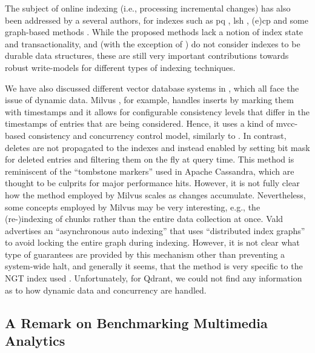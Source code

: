 The subject of online indexing (i.e., processing incremental changes) has also been addressed by a several authors, for indexes such as \acrshort{pq} \cite{Xu:2018Online}, \acrshort{lsh} \cite{Cakir:2015Adaptive}, (e)\acrshort{cp} \cite{Hojsgaard:2019Index} and some graph-based methods \cite{Zhao:2022Approximate}. While the proposed methods lack a notion of index state and transactionality, and (with the exception of \cite{Hojsgaard:2019Index}) do not consider indexes to be durable data structures, these are still very important contributions towards robust write-models for different types of indexing techniques. 

We have also discussed different vector database systems in , which all face the issue of dynamic data. Milvus \cite{Wang:2021Milvus}, for example, handles inserts by marking them with timestamps and it allows for configurable consistency levels that differ in the timestamps of entries that are being considered. Hence, it uses a kind of \acrshort{mvcc}-based consistency and concurrency control model, similarly to \cottontail. In contrast, deletes are not propagated to the indexes and instead enabled by setting bit mask for deleted entries and filtering them on the fly at query time. This method is reminiscent of the ``tombstone markers'' used in Apache Cassandra, which are thought to be culprits for major performance hits. However, it is not fully clear how the method employed by Milvus scales as changes accumulate. Nevertheless, some concepts employed by Milvus may be very interesting, e.g., the (re-)indexing of chunks rather than the entire data collection at once. Vald  advertises an ``asynchronous auto indexing'' that uses ``distributed index graphs'' to avoid locking the entire graph during indexing. However, it is not clear what type of guarantees are provided by this mechanism other than preventing a system-wide halt, and generally it seems, that the method is very specific to the NGT index used \cite{Iwasaki2016:Pruned}. Unfortunately, for Qdrant, we could not find any information as to how dynamic data and concurrency are handled.

\subsection{A Remark on Benchmarking Multimedia Analytics}

